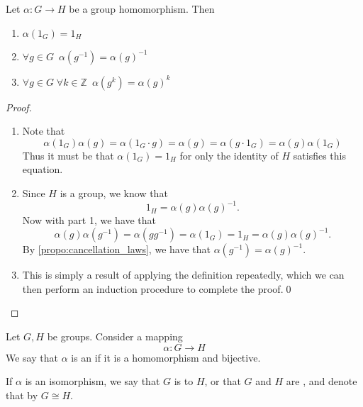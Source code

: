\begin{propo}
\label{propo:properties_of_homomorphism}
  Let $\alpha: G \to H$ be a group homomorphism. Then
  \begin{enumerate}
    \item $\alpha(1_G) = 1_H$
    \item $\forall g \in G \enspace \alpha(g^{-1}) = \alpha(g)^{-1}$
    \item $\forall g \in G \; \forall k \in \mathbb{Z} \enspace \alpha(g^k) = \alpha(g)^k$
  \end{enumerate}
\end{propo}

\begin{proof}
  \begin{enumerate}
    \item Note that
      \begin{equation*}
        \alpha(1_G) \alpha(g) = \alpha(1_G \cdot g) = \alpha(g) = \alpha(g \cdot 1_G) = \alpha(g) \alpha(1_G)
      \end{equation*}
      Thus it must be that $\alpha(1_G) = 1_H$ for only the identity of $H$ satisfies this equation.

    \item Since $H$ is a group, we know that
      \begin{equation*}
        1_H = \alpha(g)\alpha(g)^{-1}.
      \end{equation*}
      Now with part 1, we have that
      \begin{equation*}
        \alpha(g)\alpha(g^{-1}) = \alpha(gg^{-1}) = \alpha(1_G) = 1_H = \alpha(g)\alpha(g)^{-1}.
      \end{equation*}
      By \cref{propo:cancellation_laws}, we have that $\alpha(g^{-1}) = \alpha(g)^{-1}$.

    \item This is simply a result of applying the definition repeatedly, which we can then perform an induction procedure to complete the proof.\qed
  \end{enumerate}
\end{proof}

\begin{defn}[Isomorphism]
\label{defn:isomorphism}
  Let $G, H$ be groups. Consider a mapping
  \begin{equation*}
    \alpha: G \to H
  \end{equation*}
  We say that $\alpha$ is an  if it is a homomorphism and bijective.

  If $\alpha$ is an isomorphism, we say that $G$ is  to $H$, or that $G$ and $H$ are , and denote that by $G \cong H$.
\end{defn}

